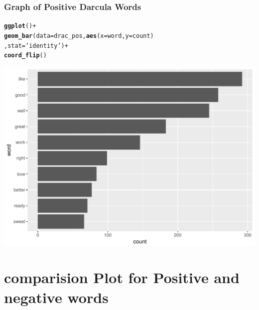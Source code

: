 \documentclass{beamer}\usepackage[]{graphicx}\usepackage[]{color}
\makeatletter
\def\maxwidth{ %
  \ifdim\Gin@nat@width>\linewidth
    \linewidth
  \else
    \Gin@nat@width
  \fi
}
\newcommand{\hlstr}[1]{\textcolor[rgb]{0.192,0.494,0.8}{#1}}%
\newcommand{\hlopt}[1]{\textcolor[rgb]{0,0,0}{#1}}%
\newcommand{\hlstd}[1]{\textcolor[rgb]{0.345,0.345,0.345}{#1}}%
\newcommand{\hlkwc}[1]{\textcolor[rgb]{0.333,0.667,0.333}{#1}}%
\newcommand{\hlkwd}[1]{\textcolor[rgb]{0.737,0.353,0.396}{\textbf{#1}}}%
\newenvironment{kframe}{%
 \def\at@end@of@kframe{}%
 \ifinner\ifhmode%
  \def\at@end@of@kframe{\end{minipage}}%
  \begin{minipage}{\columnwidth}%
 \fi\fi%
 \def\FrameCommand##1{\hskip\@totalleftmargin \hskip-\fboxsep
 \colorbox{shadecolor}{##1}\hskip-\fboxsep
     \hskip-\linewidth \hskip-\@totalleftmargin \hskip\columnwidth}%
 \MakeFramed {\advance\hsize-\width
   \@totalleftmargin\z@ \linewidth\hsize
   \@setminipage}}%
 {\par\unskip\endMakeFramed%
 \at@end@of@kframe}
\newenvironment{knitrout}{}{} %
\makeatother
\begin{document}
\begin{frame}

  \frametitle{Graph of Positive Darcula Words}
\begin{knitrout}
\color{fgcolor}\begin{kframe}
\begin{alltt}
\hlkwd{ggplot}\hlstd{()}\hlopt{+}
  \hlkwd{geom_bar}\hlstd{(}\hlkwc{data} \hlstd{= drac_pos,}\hlkwd{aes}\hlstd{(}\hlkwc{x}\hlstd{=word,}\hlkwc{y}\hlstd{=count)}
           \hlstd{,}\hlkwc{stat}\hlstd{=}\hlstr{'identity'}\hlstd{)}\hlopt{+}
  \hlkwd{coord_flip}\hlstd{()}
\end{alltt}
\end{kframe}
\includegraphics[width=\maxwidth]{figure/unnamed-chunk-14-1} 

\end{knitrout}
  
\end{frame}

\section{comparision Plot for Positive and negative words}
\end{document}
